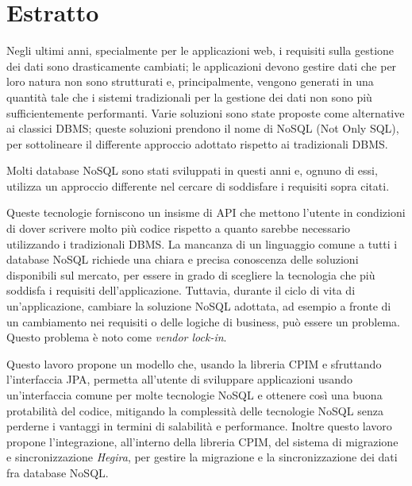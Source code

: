 \chapter*{Estratto}
Negli ultimi anni, specialmente per le applicazioni web, i requisiti sulla gestione dei dati sono drasticamente cambiati; le applicazioni devono gestire dati che per loro natura non sono strutturati e, principalmente, vengono generati in una quantit\`{a} tale che i sistemi tradizionali per la gestione dei dati non sono pi\`{u} sufficientemente performanti. Varie soluzioni sono state proposte come alternative ai classici DBMS; queste soluzioni prendono il nome di NoSQL (Not Only SQL), per sottolineare il differente approccio adottato rispetto ai tradizionali DBMS.

\noindent Molti database NoSQL sono stati sviluppati in questi anni e, ognuno di essi, utilizza un approccio differente nel cercare di soddisfare i requisiti sopra citati.

\noindent Queste tecnologie forniscono un insisme di API che mettono l'utente in condizioni di dover scrivere molto pi\`{u}  codice rispetto a quanto sarebbe necessario utilizzando i tradizionali DBMS. 
La mancanza di un linguaggio comune a tutti i database NoSQL richiede una chiara e precisa conoscenza delle soluzioni disponibili sul mercato, per essere in grado di scegliere la tecnologia che pi\`{u} soddisfa i requisiti dell'applicazione. Tuttavia, durante il ciclo di vita di un'applicazione, cambiare la soluzione NoSQL adottata, ad esempio a fronte di un cambiamento nei requisiti o delle logiche di business, pu\`{o} essere un problema. Questo problema \`{e} noto come \textit{vendor lock-in}.

\noindent Questo lavoro propone un modello che, usando la libreria CPIM e sfruttando l'interfaccia JPA, permetta all'utente di sviluppare applicazioni usando un'interfaccia comune per molte tecnologie NoSQL e ottenere cos\`{i} una buona protabilit\`{a} del codice, mitigando la complessit\`{a} delle tecnologie NoSQL senza perderne i vantaggi in termini di salabilit\`{a} e performance. Inoltre questo lavoro propone l'integrazione, all'interno della libreria CPIM, del sistema di migrazione e sincronizzazione \textit{Hegira}, per gestire la migrazione e la sincronizzazione dei dati fra database NoSQL.

\cleardoublepage

